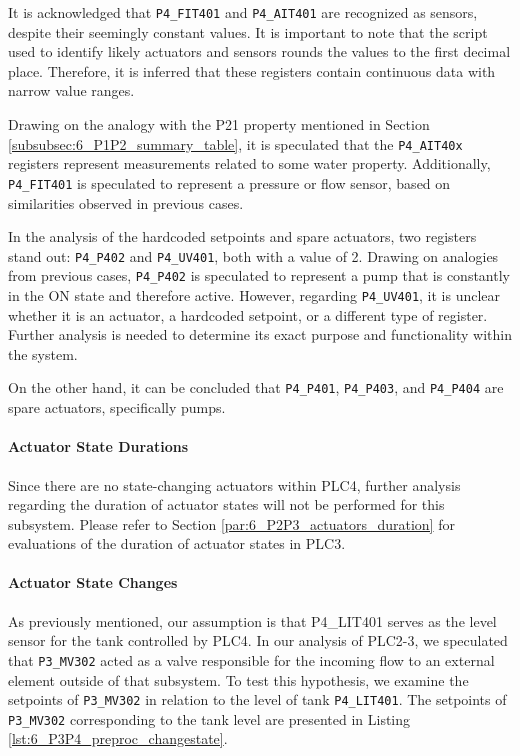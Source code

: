\bigskip
It is acknowledged that \texttt{P4\_FIT401} and \texttt{P4\_AIT401} are recognized as sensors, despite their seemingly constant values. It is important to note that the script used to identify likely actuators and sensors rounds the values to the first decimal place. Therefore, it is inferred that these registers contain continuous data with narrow value ranges.

Drawing on the analogy with the P21 property mentioned in Section \ref{subsubsec:6_P1P2_summary_table}, it is speculated that the \texttt{P4\_AIT40x} registers represent measurements related to some water property. Additionally, \texttt{P4\_FIT401} is speculated to represent a pressure or flow sensor, based on similarities observed in previous cases.

\bigskip
In the analysis of the hardcoded setpoints and spare actuators, two registers stand out: \texttt{P4\_P402} and \texttt{P4\_UV401}, both with a value of 2. Drawing on analogies from previous cases, \texttt{P4\_P402} is speculated to represent a pump that is constantly in the ON state and therefore active. However, regarding \texttt{P4\_UV401}, it is unclear whether it is an actuator, a hardcoded setpoint, or a different type of register. Further analysis is needed to determine its exact purpose and functionality within the system.

On the other hand, it can be concluded that \texttt{P4\_P401}, \texttt{P4\_P403}, and \texttt{P4\_P404} are spare actuators, specifically pumps. 

\paragraph{Actuator State Durations}
\label{par:6_P3P4_actuators_duration}
Since there are no state-changing actuators within PLC4, further analysis regarding the duration of actuator states will not be performed for this subsystem. Please refer to Section \ref{par:6_P2P3_actuators_duration} for evaluations of the duration of actuator states in PLC3.

\paragraph{Actuator State Changes}
\label{par:6_preproc_P3P4_actuator_state_changes}
As previously mentioned, our assumption is that P4\_LIT401 serves as the level sensor for the tank controlled by PLC4. In our analysis of PLC2-3, we speculated that \texttt{P3\_MV302} acted as a valve responsible for the incoming flow to an external element outside of that subsystem. To test this hypothesis, we examine the setpoints of \texttt{P3\_MV302} in relation to the level of tank \texttt{P4\_LIT401}. The setpoints of \texttt{P3\_MV302} corresponding to the tank level are presented in Listing \ref{lst:6_P3P4_preproc_changestate}.

